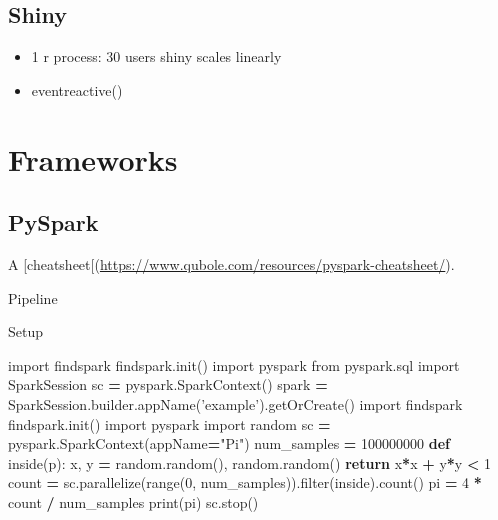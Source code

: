 \documentclass[]{book}
\newenvironment{Shaded}{\begin{snugshade}}{\end{snugshade}}
\newcommand{\KeywordTok}[1]{\textcolor[rgb]{0.13,0.29,0.53}{\textbf{#1}}}
\newcommand{\DecValTok}[1]{\textcolor[rgb]{0.00,0.00,0.81}{#1}}
\newcommand{\StringTok}[1]{\textcolor[rgb]{0.31,0.60,0.02}{#1}}
\newcommand{\ImportTok}[1]{#1}
\newcommand{\ControlFlowTok}[1]{\textcolor[rgb]{0.13,0.29,0.53}{\textbf{#1}}}
\newcommand{\OperatorTok}[1]{\textcolor[rgb]{0.81,0.36,0.00}{\textbf{#1}}}
\newcommand{\BuiltInTok}[1]{#1}
\newcommand{\NormalTok}[1]{#1}
\theoremstyle{definition}
\theoremstyle{definition}
\theoremstyle{definition}
\theoremstyle{remark}
\begin{document}
\section{Shiny}\label{shiny}

\begin{itemize}
\item
  1 r process: 30 users \textbar{} shiny scales linearly
\item
  eventreactive()
\end{itemize}

\chapter{Frameworks}\label{frameworks}

\section{PySpark}\label{pyspark}

A
{[}cheatsheet{[}(\url{https://www.qubole.com/resources/pyspark-cheatsheet/}).

Pipeline

Setup

\begin{Shaded}
\begin{Highlighting}[]
\ImportTok{import}\NormalTok{ findspark}
\NormalTok{findspark.init()}
\ImportTok{import}\NormalTok{ pyspark}
\ImportTok{from}\NormalTok{ pyspark.sql }\ImportTok{import}\NormalTok{ SparkSession}
\NormalTok{sc }\OperatorTok{=}\NormalTok{ pyspark.SparkContext()}
\NormalTok{spark }\OperatorTok{=}\NormalTok{ SparkSession.builder.appName(}\StringTok{'example'}\NormalTok{).getOrCreate()}
\ImportTok{import}\NormalTok{ findspark}
\NormalTok{findspark.init()}
\ImportTok{import}\NormalTok{ pyspark}
\ImportTok{import}\NormalTok{ random}
\NormalTok{sc }\OperatorTok{=}\NormalTok{ pyspark.SparkContext(appName}\OperatorTok{=}\StringTok{"Pi"}\NormalTok{)}
\NormalTok{num_samples }\OperatorTok{=} \DecValTok{100000000}
\KeywordTok{def}\NormalTok{ inside(p):     }
\NormalTok{    x, y }\OperatorTok{=}\NormalTok{ random.random(), random.random()}
    \ControlFlowTok{return}\NormalTok{ x}\OperatorTok{*}\NormalTok{x }\OperatorTok{+}\NormalTok{ y}\OperatorTok{*}\NormalTok{y }\OperatorTok{<} \DecValTok{1}
\NormalTok{count }\OperatorTok{=}\NormalTok{ sc.parallelize(}\BuiltInTok{range}\NormalTok{(}\DecValTok{0}\NormalTok{, num_samples)).}\BuiltInTok{filter}\NormalTok{(inside).count()}
\NormalTok{pi }\OperatorTok{=} \DecValTok{4} \OperatorTok{*}\NormalTok{ count }\OperatorTok{/}\NormalTok{ num_samples}
\BuiltInTok{print}\NormalTok{(pi)}
\NormalTok{sc.stop()}
\end{Highlighting}
\end{Shaded}
\end{document}
